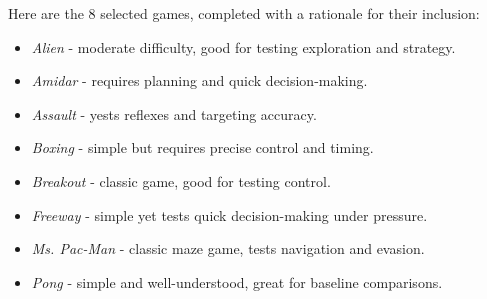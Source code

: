Here are the 8 selected games, completed with a rationale for their inclusion:
\begin{itemize}
	\item \textit{Alien} - moderate difficulty, good for testing exploration and strategy.
	\item \textit{Amidar} - requires planning and quick decision-making.
	\item \textit{Assault} - yests reflexes and targeting accuracy.
	\item \textit{Boxing} - simple but requires precise control and timing.
	\item \textit{Breakout} - classic game, good for testing control.
	\item \textit{Freeway} - simple yet tests quick decision-making under pressure.
	\item \textit{Ms. Pac-Man} - classic maze game, tests navigation and evasion.
	\item \textit{Pong} - simple and well-understood, great for baseline comparisons.
\end{itemize}
